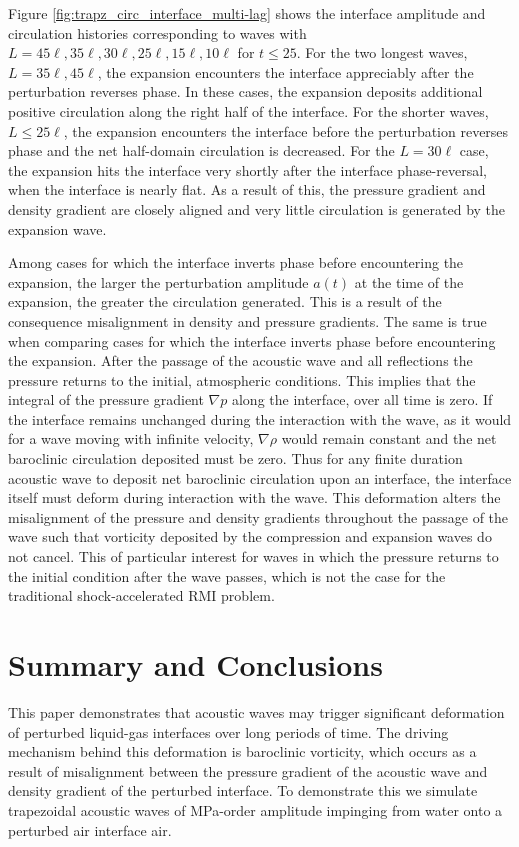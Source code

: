 \documentclass{jfm}%
\begin{document}
Figure \ref{fig:trapz_circ_interface_multi-lag} shows the interface
amplitude and circulation histories corresponding to waves with
$L=45\ell, 35\ell ,30\ell ,25\ell ,15\ell ,10\ell$ for $t\leq 25$.
For the two longest waves, $L=35\ell, 45\ell$, the expansion
encounters the interface appreciably after the perturbation reverses
phase. In these cases, the expansion deposits additional positive
circulation along the right half of the interface. For the shorter
waves, $L \leq 25\ell$, the expansion encounters the interface before
the perturbation reverses phase and the net half-domain circulation is
decreased. For the $L=30\ell$ case, the expansion hits the interface
very shortly after the interface phase-reversal, when the interface is
nearly flat. As a result of this, the pressure gradient and density
gradient are closely aligned and very little circulation is generated
by the expansion wave.

Among cases for which the interface inverts phase before encountering
the expansion, the larger the perturbation amplitude $a(t)$ at the
time of the expansion, the greater the circulation generated. This is
a result of the consequence misalignment in density and pressure
gradients. The same is true when comparing cases for which the
interface inverts phase before encountering the expansion. After the
passage of the acoustic wave and all reflections the pressure returns
to the initial, atmospheric conditions. This implies that the integral
of the pressure gradient $\nabla p$ along the interface, over all time
is zero. If the interface remains unchanged during the interaction
with the wave, as it would for a wave moving with infinite velocity,
$\nabla \rho$ would remain constant and the net baroclinic circulation
deposited must be zero. Thus for any finite duration acoustic wave to
deposit net baroclinic circulation upon an interface, the interface
itself must deform during interaction with the wave. This deformation
alters the misalignment of the pressure and density gradients
throughout the passage of the wave such that vorticity deposited by
the compression and expansion waves do not cancel. This of particular
interest for waves in which the pressure returns to the initial
condition after the wave passes, which is not the case for the
traditional shock-accelerated \ac{RMI} problem.

\section{Summary and Conclusions}
\label{sec:conclusions}
This paper demonstrates that acoustic waves may trigger significant
deformation of perturbed liquid-gas interfaces over long periods of
time. The driving mechanism behind this deformation is baroclinic
vorticity, which occurs as a result of misalignment between the
pressure gradient of the acoustic wave and density gradient of the
perturbed interface. To demonstrate this we simulate trapezoidal
acoustic waves of MPa-order amplitude impinging from water onto a
perturbed air interface air.
\end{document}

